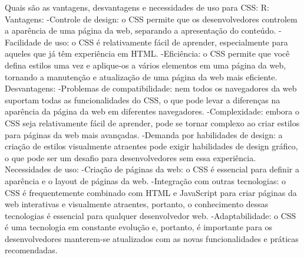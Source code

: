 Quais são as vantagens, desvantagens e necessidades de uso para CSS:
R:
Vantagens:
  -Controle de design: o CSS permite que os desenvolvedores controlem a aparência de uma página da web, separando a apresentação do conteúdo.
  -Facilidade de uso: o CSS é relativamente fácil de aprender, especialmente para aqueles que já têm experiência em HTML.
  -Eficiência: o CSS permite que você defina estilos uma vez e aplique-os a vários elementos em uma página da web, tornando a manutenção e atualização de uma página da web mais eficiente.
Desvantagens:
  -Problemas de compatibilidade: nem todos os navegadores da web suportam todas as funcionalidades do CSS, o que pode levar a diferenças na aparência da página da web em diferentes navegadores.
  -Complexidade: embora o CSS seja relativamente fácil de aprender, pode se tornar complexo ao criar estilos para páginas da web mais avançadas.
  -Demanda por habilidades de design: a criação de estilos visualmente atraentes pode exigir habilidades de design gráfico, o que pode ser um desafio para desenvolvedores sem essa experiência.
Necessidades de uso:
  -Criação de páginas da web: o CSS é essencial para definir a aparência e o layout de páginas da web.
  -Integração com outras tecnologias: o CSS é frequentemente combinado com HTML e JavaScript para criar páginas da web interativas e visualmente atraentes, portanto, o conhecimento dessas tecnologias é essencial para qualquer desenvolvedor web.
  -Adaptabilidade: o CSS é uma tecnologia em constante evolução e, portanto, é importante para os desenvolvedores manterem-se atualizados com as novas funcionalidades e práticas recomendadas.